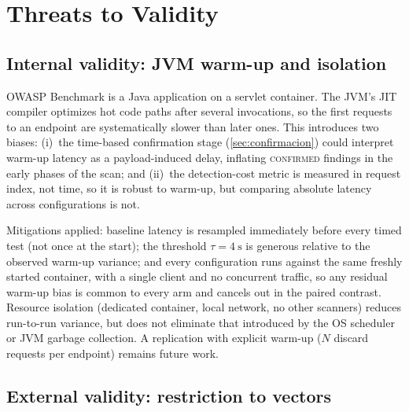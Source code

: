 
\section{Threats to Validity}
\label{sec:amenazas}

\subsection{Internal validity: JVM warm-up and isolation}

OWASP Benchmark is a Java application on a servlet container. The JVM's JIT
compiler optimizes hot code paths after several invocations, so the first
requests to an endpoint are systematically slower than later ones. This
introduces two biases: (i)~the time-based confirmation stage
(\cref{sec:confirmacion}) could interpret warm-up latency as a
payload-induced delay, inflating \textsc{confirmed} findings in the early
phases of the scan; and (ii)~the detection-cost metric is measured in request
index, not time, so it is robust to warm-up, but comparing absolute latency
across configurations is not.

Mitigations applied: baseline latency is resampled immediately before every
timed test (not once at the start); the threshold $\tau = \SI{4}{\second}$ is
generous relative to the observed warm-up variance; and every configuration
runs against the same freshly started container, with a single client and no
concurrent traffic, so any residual warm-up bias is common to every arm and
cancels out in the paired contrast. Resource isolation (dedicated container,
local network, no other scanners) reduces run-to-run variance, but does not
eliminate that introduced by the OS scheduler or JVM garbage collection. A
replication with explicit warm-up ($N$ discard requests per endpoint) remains
future work.

\subsection{External validity: restriction to  vectors}

